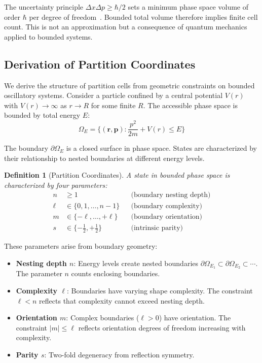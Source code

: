\documentclass[twocolumn,aps,prb,superscriptaddress,longbibliography,floatfix]{revtex4-2}
\newtheorem{definition}[theorem]{Definition}
\theoremstyle{remark}
\begin{document}
The uncertainty principle $\Delta x \Delta p \geq \hbar/2$ sets a minimum
phase space volume of order $\hbar$ per degree of freedom~\cite{Heisenberg1927}.
Bounded total volume therefore implies finite cell count. This is not an
approximation but a consequence of quantum mechanics applied to bounded
systems.

\subsection{Derivation of Partition Coordinates}

We derive the structure of partition cells from geometric constraints on
bounded oscillatory systems. Consider a particle confined by a central
potential $V(r)$ with $V(r) \to \infty$ as $r \to R$ for some finite $R$.
The accessible phase space is bounded by total energy $E$:
\begin{equation}
\Omega_E = \{(\mathbf{r}, \mathbf{p}) : \frac{p^2}{2m} + V(r) \leq E\}
\end{equation}

The boundary $\partial\Omega_E$ is a closed surface in phase space.
States are characterized by their relationship to nested boundaries at
different energy levels.

\begin{definition}[Partition Coordinates]
\label{def:coords}
A state in bounded phase space is characterized by four parameters:
\begin{align}
n &\geq 1 && \text{(boundary nesting depth)} \label{eq:n} \\
\ell &\in \{0, 1, \ldots, n-1\} && \text{(boundary complexity)} \label{eq:l} \\
m &\in \{-\ell, \ldots, +\ell\} && \text{(boundary orientation)} \label{eq:m} \\
s &\in \{-\tfrac{1}{2}, +\tfrac{1}{2}\} && \text{(intrinsic parity)} \label{eq:s}
\end{align}
\end{definition}

These parameters arise from boundary geometry:
\begin{itemize}
    \item \textbf{Nesting depth $n$}: Energy levels create nested boundaries
    $\partial\Omega_{E_1} \subset \partial\Omega_{E_2} \subset \cdots$. The
    parameter $n$ counts enclosing boundaries.

    \item \textbf{Complexity $\ell$}: Boundaries have varying shape
    complexity. The constraint $\ell < n$ reflects that complexity cannot
    exceed nesting depth.

    \item \textbf{Orientation $m$}: Complex boundaries ($\ell > 0$) have
    orientation. The constraint $|m| \leq \ell$ reflects orientation
    degrees of freedom increasing with complexity.

    \item \textbf{Parity $s$}: Two-fold degeneracy from reflection symmetry.
\end{itemize}
\end{document}
